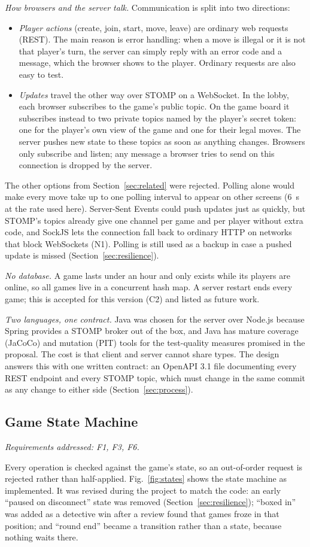 \documentclass[lettersize,journal]{IEEEtran}
\newcommand{\reqs}[1]{\noindent\textit{Requirements addressed: #1.}\par\smallskip}
\begin{document}
\emph{How browsers and the server talk.} Communication is split into two directions:
\begin{itemize}
	\item \emph{Player actions} (create, join, start, move, leave) are ordinary web requests (REST). The main reason is error handling: when a move is illegal or it is not that player's turn, the server can simply reply with an error code and a message, which the browser shows to the player. Ordinary requests are also easy to test.
	\item \emph{Updates} travel the other way over STOMP on a WebSocket. In the lobby, each browser subscribes to the game's public topic. On the game board it subscribes instead to two private topics named by the player's secret token: one for the player's own view of the game and one for their legal moves. The server pushes new state to these topics as soon as anything changes. Browsers only subscribe and listen; any message a browser tries to send on this connection is dropped by the server.
\end{itemize}
The other options from Section~\ref{sec:related} were rejected. Polling alone would make every move take up to one polling interval to appear on other screens (6~s at the rate used here). Server-Sent Events could push updates just as quickly, but STOMP's topics already give one channel per game and per player without extra code, and SockJS lets the connection fall back to ordinary HTTP on networks that block WebSockets (N1). Polling is still used as a backup in case a pushed update is missed (Section~\ref{sec:resilience}).

\emph{No database.} A game lasts under an hour and only exists while its players are online, so all games live in a concurrent hash map. A server restart ends every game; this is accepted for this version (C2) and listed as future work.

\emph{Two languages, one contract.} Java was chosen for the server over Node.js because Spring provides a STOMP broker out of the box, and Java has mature coverage (JaCoCo) and mutation (PIT) tools for the test-quality measures promised in the proposal. The cost is that client and server cannot share types. The design answers this with one written contract: an OpenAPI 3.1 file documenting every REST endpoint and every STOMP topic, which must change in the same commit as any change to either side (Section~\ref{sec:process}).

\subsection{Game State Machine}\label{sec:states}
\reqs{F1, F3, F6}
Every operation is checked against the game's state, so an out-of-order request is rejected rather than half-applied. Fig.~\ref{fig:states} shows the state machine as implemented. It was revised during the project to match the code: an early ``paused on disconnect'' state was removed (Section~\ref{sec:resilience}); ``boxed in'' was added as a detective win after a review found that games froze in that position; and ``round end'' became a transition rather than a state, because nothing waits there.
\end{document}
